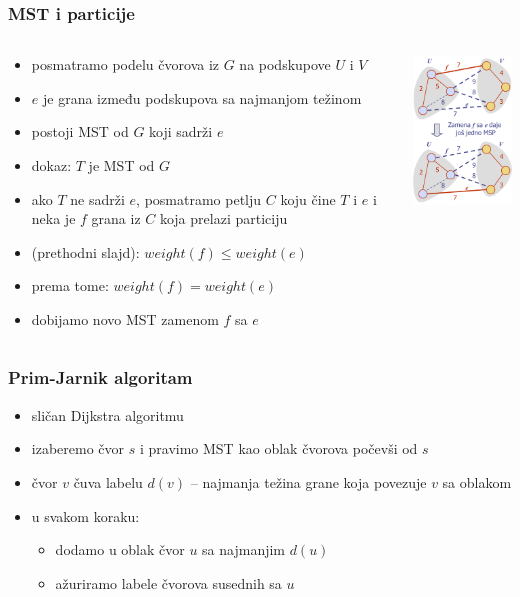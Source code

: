 \documentclass[compress,aspectratio=169]{beamer}
\begin{document}
\begin{frame}[fragile]
  \frametitle{MST i particije}
  \begin{columns}
    \begin{column}[t]{7cm}
      \begin{itemize}
        \item posmatramo podelu čvorova iz $G$ na podskupove $U$ i $V$
        \item $e$ je grana između podskupova sa najmanjom težinom
        \item postoji MST od $G$ koji sadrži $e$
        \item dokaz: $T$ je MST od $G$
        \item ako $T$ ne sadrži $e$, posmatramo petlju $C$ koju čine $T$
          i $e$ i neka je $f$ grana iz $C$ koja prelazi particiju
        \item (prethodni slajd): $weight(f)\leq weight(e)$
        \item prema tome: $weight(f)=weight(e)$
        \item dobijamo novo MST zamenom $f$ sa $e$
      \end{itemize}
    \end{column}
    \begin{column}[t]{5cm}
      \begin{center}
        \includegraphics[width=4.3cm]{asp-14-pic71.png}
      \end{center}
    \end{column}
  \end{columns}
\end{frame}

\begin{frame}[fragile]
  \frametitle{Prim-Jarnik algoritam}
  \begin{itemize}
    \item sličan Dijkstra algoritmu
    \item izaberemo čvor $s$ i pravimo MST kao oblak čvorova počevši od 
      $s$
    \item čvor $v$ čuva labelu $d(v)$ -- najmanja težina grane koja
      povezuje $v$ sa oblakom
    \item u svakom koraku:
    \begin{itemize}
      \item dodamo u oblak čvor $u$ sa najmanjim $d(u)$
      \item ažuriramo labele čvorova susednih sa $u$
    \end{itemize}
  \end{itemize}
\end{frame}
\end{document}
